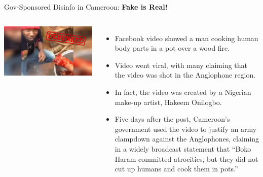 \documentclass[nobackground,dvipsnames,table,aspectratio=169]{beamer}
\begin{document}
\begin{frame}{Gov-Sponsored Disinfo in Cameroon: \textbf{Fake is Real!}}
    \begin{columns}
            \includegraphics[width=\textwidth]{cameroon-disinfo-3}
            \begin{itemize}
                \small
                \item Facebook video showed a man cooking human body parts in a pot over a wood fire.
                \item Video went viral, with many claiming that the video was shot in the Anglophone region.
                \item In fact, the video was created by a Nigerian make-up artist, Hakeem Onilogbo.
                \item Five days after the post, Cameroon’s government used the video to justify an army clampdown against the Anglophones, claiming in a widely broadcast statement that “Boko Haram committed atrocities, but they did not cut up humans and cook them in pots.”
            \end{itemize}
    \end{columns}
\end{frame}
\end{document}
